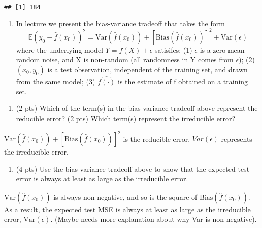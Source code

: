\documentclass[
]{article}
\providecommand{\tightlist}{%
  \setlength{\itemsep}{0pt}\setlength{\parskip}{0pt}}
\begin{document}
\begin{verbatim}
## [1] 184
\end{verbatim}

\begin{enumerate}
\def\labelenumi{\arabic{enumi}.}
\setcounter{enumi}{3}
\tightlist
\item
  In lecture we present the bias-variance tradeoff that takes the form
  \[\mathbb{E}(y_0-\hat{f}(x_0))^2 = \text{Var}(\hat{f}(x_0))+[\text{Bias}(\hat{f}(x_0))]^2+\text{Var}(\epsilon)\]
  where the underlying model \(Y = f(X) + \epsilon\) satisifes: (1)
  \(\epsilon\) is a zero-mean random noise, and X is non-random (all
  randomness in Y comes from \(\epsilon\)); (2) \((x_0, y_0)\) is a test
  observation, independent of the training set, and drawn from the same
  model; (3) \(\hat{f(\cdot)}\) is the estimate of f obtained on a
  training set.
\end{enumerate}

\begin{enumerate}
\def\labelenumi{\alph{enumi}.}
\tightlist
\item
  (2 pts) Which of the term(s) in the bias-variance tradeoff above
  represent the reducible error? (2 pts) Which term(s) represent the
  irreducible error?
\end{enumerate}

\(\text{Var}(\hat{f}(x_0))+[\text{Bias}(\hat{f}(x_0))]^2\) is the
reducible error. \(Var(\epsilon)\) represents the irreducible error.

\begin{enumerate}
\def\labelenumi{\alph{enumi}.}
\setcounter{enumi}{1}
\tightlist
\item
  (4 pts) Use the bias-variance tradeoff above to show that the expected
  test error is always at least as large as the irreducible error.
\end{enumerate}

\(\text{Var}(\hat{f}(x_0))\) is always non-negative, and so is the
square of \(\text{Bias}(\hat{f}(x_0))\). As a result, the expected test
MSE is always at least as large as the irreducible error,
\(\text{Var}(\epsilon)\). (Maybe needs more explanation about why Var is
non-negative).
\end{document}

